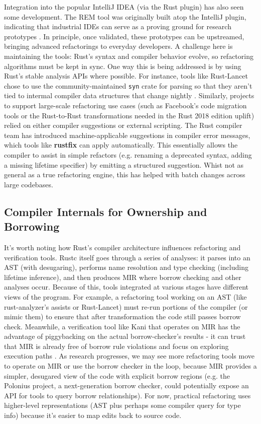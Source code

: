 Integration into the popular IntelliJ IDEA (via the Rust plugin) has also seen
some development. The REM tool was originally built atop the IntelliJ plugin,
indicating that industrial IDEs can serve as a proving ground for research
prototypes \cite{AdventureOfALifetime}. In principle, once validated, these
prototypes can be upstreamed, bringing advanced refactorings to everyday
developers. A challenge here is maintaining the tools: Rust's syntax and
compiler behavior evolve, so refactoring algorithms must be kept in sync. One
way this is being addressed is by using Rust's stable analysis APIs where
possible. For instance, tools like Rust-Lancet chose to use the
community-maintained \texttt{syn} crate for parsing so that they aren't tied to
intermal compiler data structures that change nightly \cite{RustLancet}.
Similarly, projects to support large-scale refactoring use cases (such as
Facebook's code migration tools or the Rust-to-Rust transformations needed in
the Rust 2018 edition uplift) relied on either compiler suggestions or external
scripting. The Rust compiler team has introduced machine-applicable suggestions
in compiler error messages, which tools like \textbf{rustfix} can apply
automatically. This essentially allows the compiler to assist in simple
refactors (e.g. renaming a deprecated syntax, adding a missing lifetime
specifier) by emitting a structured suggestion. Whist not as general as a true
refactoring engine, this has helped with batch changes across large codebases.

\subsection{Compiler Internals for Ownership and Borrowing}
It's worth noting how Rust's compiler architecture influences refactoring and
verification tools. Rustc itself goes through a series of analyses: it parses
into an AST (with desugaring), performs name resolution and type checking
(including lifetime inference), and then produces MIR where
borrow checking and other analyses occur. Because of this, tools integrated at various stages
have different views of the program. For example, a refactoring tool working on
an AST (like rust-analyzer's assists or Rust-Lancet) must re-run portions of
the compiler (or mimic them) to ensure that after transformation the code still
passes borrow check. Meanwhile, a verification tool like Kani that operates on
MIR has the advantage of piggybacking on the actual borrow-checker's results -
it can trust that MIR is already free of borrow rule violations and focus on
exploring execution paths \cite{verifying_dynamic_trait_objects}. As research
progresses, we may see more refactoring tools move to operate on MIR or use the
borrow checker in the loop, because MIR provides a simpler, desugared view of
the code with explicit borrow regions (e.g. the Polonius project, a
next-generation borrow checker, could potentially expose an API for tools to
query borrow relationships). For now, practical refactoring uses higher-level
representations (AST plus perhaps some compiler query for type info) because
it's easier to map edits back to source code.

